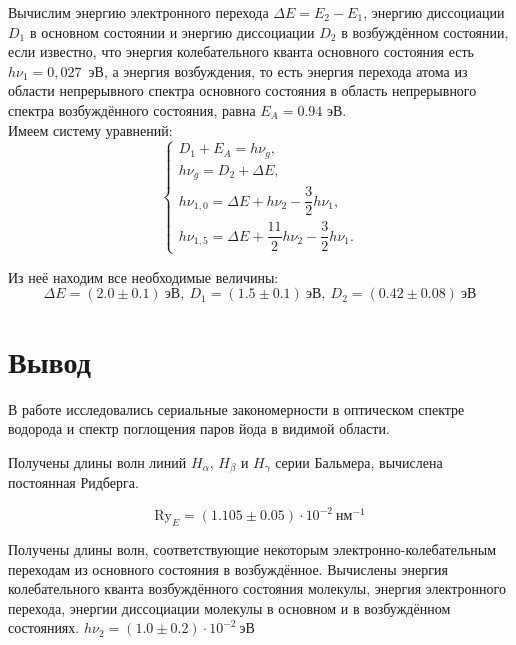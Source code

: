 		Вычислим энергию электронного перехода $\Delta E=E_2-E_1$, энергию диссоциации $D_1$ в основном состоянии и энергию диссоциации $D_2$ в возбуждённом состоянии, если известно, что энергия колебательного кванта основного состояния есть $h\nu_1=0,027$~эВ, а энергия возбуждения, то есть энергия перехода атома из области непрерывного спектра основного состояния в область непрерывного спектра возбуждённого состояния, равна $E_A=0.94$ эВ.\\
		Имеем систему уравнений:
		\begin{equation*}
			\begin{cases}
				D_1+E_A=h \nu_g,\\
				h\nu_g=D_2+\Delta E,\\
				h\nu_{1,0}=\Delta E+h\nu_2-\dfrac{3}{2}h\nu_1,\\
					h\nu_{1,5}=\Delta E+\dfrac{11}{2}h\nu_2-\dfrac{3}{2}h\nu_1.
			\end{cases}
		\end{equation*}

		Из неё находим все необходимые величины:
		\[ \Delta E=(2.0\pm 0.1) \ \text{эВ}, \ D_1=(1.5\pm 0.1)\  \text{эВ}, \  D_2=(0.42\pm 0.08) \ \text{эВ} \]

\section{Вывод}
	В работе исследовались сериальные закономерности в оптическом спектре водорода и спектр поглощения паров йода в видимой области.
	
	Получены длины волн линий $H_{\alpha}$, $H_{\beta}$ и $H_{\gamma}$ серии Бальмера, вычислена постоянная Ридберга. 
    
    \[ \text{Ry}_E=(1.105\pm 0.05)\cdot 10^{-2} ~\text{нм}^{-1} \]
	
	Получены длины волн, соответствующие некоторым электронно-колебательным переходам из основного состояния в возбуждённое. Вычислены энергия колебательного кванта возбуждённого состояния молекулы, энергия электронного перехода, энергии диссоциации молекулы в основном и в возбуждённом состояниях.
	$h\nu_2=(1.0\pm 0.2)\cdot 10^{-2} \ \text{эВ}$


